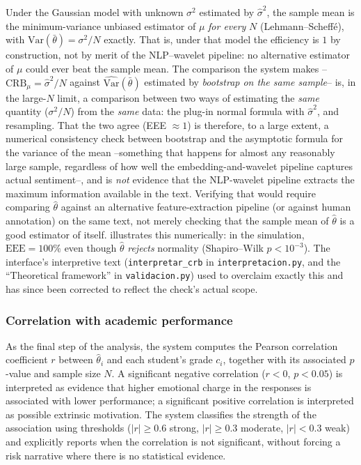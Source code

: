\documentclass[11pt,a4paper,oneside]{article}
\theoremstyle{definition}
\begin{document}
\begin{warningBox}[title=Gap: what this check does NOT certify]
Under the Gaussian model with unknown $\sigma^2$ estimated by $\hat\sigma^2$, the sample mean is
the minimum-variance unbiased estimator of $\mu$ \emph{for every} $N$ (Lehmann--Scheff\'e), with
$\mathrm{Var}(\bar\theta)=\sigma^2/N$ exactly. That is, under that model the efficiency is $1$ by
construction, not by merit of the NLP--wavelet pipeline: no alternative estimator of $\mu$ could
ever beat the sample mean. The comparison the system makes --$\mathrm{CRB}_\mu=\hat\sigma^2/N$
against $\widehat{\mathrm{Var}}(\bar\theta)$ estimated by \emph{bootstrap on the same sample}--
is, in the large-$N$ limit, a comparison between two ways of estimating the \emph{same} quantity
($\sigma^2/N$) from the \emph{same} data: the plug-in normal formula with $\hat\sigma^2$, and
resampling. That the two agree (EEE $\approx 1$) is therefore, to a large extent, a numerical
consistency check between bootstrap and the asymptotic formula for the variance of the mean
--something that happens for almost any reasonably large sample, regardless of how well the
embedding-and-wavelet pipeline captures actual sentiment--, and is \emph{not} evidence that the
NLP-wavelet pipeline extracts the maximum information available in the text. Verifying that
would require comparing $\hat\theta$ against an alternative feature-extraction pipeline (or
against human annotation) on the same text, not merely checking that the sample mean of
$\hat\theta$ is a good estimator of itself.  illustrates this numerically:
in the simulation, $\mathrm{EEE}=100\%$ even though $\hat\theta$ \emph{rejects} normality
(Shapiro--Wilk $p<10^{-3}$). The interface's interpretive text
(\texttt{interpretar\_crb} in \texttt{interpretacion.py}, and the ``Theoretical framework'' in
\texttt{validacion.py}) used to overclaim exactly this and has since been corrected to reflect
the check's actual scope.
\end{warningBox}

\subsubsection{Correlation with academic performance}

As the final step of the analysis, the system computes the Pearson correlation coefficient $r$
\cite{Pearson1896} between $\hat\theta_i$ and each student's grade $c_i$, together with its
associated $p$-value and sample size $N$. A significant negative correlation ($r<0$, $p<0.05$) is
interpreted as evidence that higher emotional charge in the responses is associated with lower
performance; a significant positive correlation is interpreted as possible extrinsic motivation.
The system classifies the strength of the association using thresholds ($|r|\ge 0.6$ strong,
$|r|\ge 0.3$ moderate, $|r|<0.3$ weak) and explicitly reports when the correlation is not
significant, without forcing a risk narrative where there is no statistical evidence.
\end{document}
